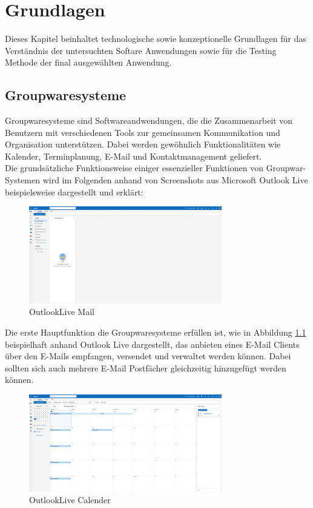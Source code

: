 \chapter{Grundlagen}

Dieses Kapitel beinhaltet technologische sowie konzeptionelle Grundlagen für das \\
Verständnis der untersuchten Softare Anwendungen sowie für die Testing Methode der final ausgewählten Anwendung.

\section{Groupwaresysteme}

Groupwaresysteme sind Softwareandwendungen, die die Zusammenarbeit von Benutzern mit verschiedenen Tools zur gemeinsamen Kommunikation und Organisation unterstützen.
Dabei werden gewöhnlich Funktionalitäten wie Kalender, Terminplanung, E-Mail und Kontaktmanagement geliefert.
\\
Die grundsätzliche Funktionsweise einiger essenzieller Funktionen von Groupwar-Systemen wird im Folgenden anhand von Screenshots aus Microsoft Outlook Live beispielsweise dargestellt und erklärt:
\begin{figure}[H]
    \centering
    \includegraphics[width=0.75\textwidth]{images/OutlookLive_Mail1.png}
    \caption{OutlookLive Mail}
    \label{fig:outlook-live-mail}
\end{figure}
Die erste Hauptfunktion die Groupwaresysteme erfüllen ist, wie in Abbildung \ref{fig:outlook-live-mail} beispielhaft anhand Outlook Live dargestellt, das anbieten eines E-Mail Clients über den E-Mails empfangen, versendet und verwaltet werden können.
Dabei sollten sich auch mehrere E-Mail Postfächer gleichzeitig hinzugefügt werden können.


\begin{figure}[H]
    \centering
    \includegraphics[width=0.75\textwidth]{images/OutlookLive_Calender1.png}
    \caption{OutlookLive Calender}
    \label{fig:outlook-live-calender}
\end{figure}

